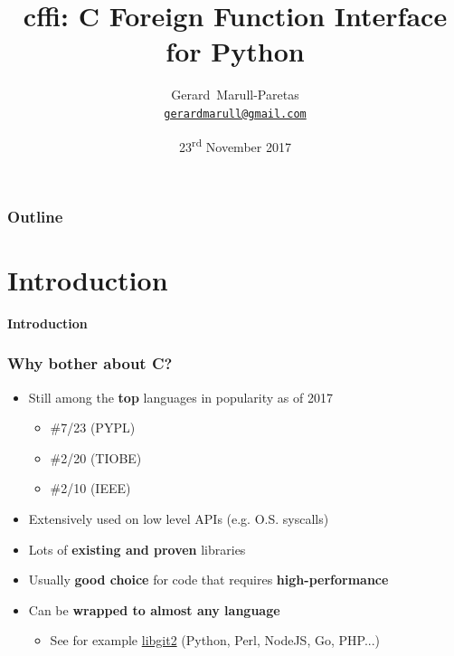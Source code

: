 \documentclass{beamer}
\title{cffi: C Foreign Function Interface for Python}
\author{Gerard~Marull-Paretas\\
        \href{mailto:gerardmarull@gmail.com}{\texttt{gerardmarull@gmail.com}}}
\date{23\textsuperscript{rd} November 2017}
\begin{document}
\begin{frame}
  \thispagestyle{empty}
  \titlepage{}
\end{frame}

\begin{frame}
  \frametitle{Outline}
  \tableofcontents
\end{frame}

\section{Introduction}

\begin{frame}[plain]{}
  \begin{center}
    \Huge \textbf{Introduction}
  \end{center}
\end{frame}

\begin{frame}
  \frametitle{Why bother about C?}

  \begin{itemize}
    \item<1-> Still among the \textbf{top} languages in popularity as of 2017
      \begin{itemize}
        \item \#7/23 (PYPL)
        \item \#2/20 (TIOBE)
        \item \#2/10 (IEEE)
      \end{itemize}
    \item<2-> Extensively used on low level APIs (e.g. O.S. syscalls)
    \item<3-> Lots of \textbf{existing and proven} libraries
    \item<4-> Usually \textbf{good choice} for code that requires
      \textbf{high-performance}
    \item<5-> Can be \textbf{wrapped to almost any language}
      \begin{itemize}
        \item See for example \href{https://libgit2.github.com/}{libgit2}
          (Python, Perl, NodeJS, Go, PHP...)
      \end{itemize}
  \end{itemize}
\end{frame}
\end{document}
